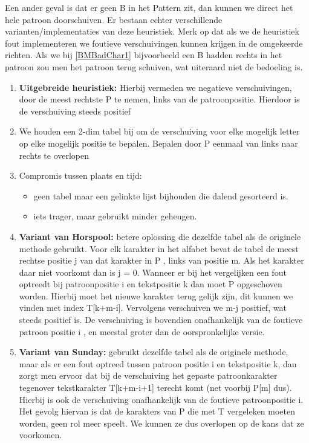 Een ander geval is dat er geen B in het Pattern zit, dan kunnen we direct het hele patroon doorschuiven.
\clearpage
Er bestaan echter verschillende varianten/implementaties van deze heuristiek. Merk op dat als we de heuristiek fout implementeren we foutieve verschuivingen kunnen krijgen in de omgekeerde richten. Als we bij \ref{BMBadChar1} bijvoorbeeld een B hadden rechts in het patroon zou men het patroon terug schuiven, wat uiteraard niet de bedoeling is.
\begin{enumerate}
\item \textbf{Uitgebreide heuristiek:} Hierbij vermeden we negatieve verschuivingen, door de meest rechtste P te nemen, links van de patroonpositie. Hierdoor is de verschuiving steeds positief
\item We houden een 2-dim tabel bij om de verschuiving voor elke mogelijk letter op elke mogelijk positie te bepalen. Bepalen door P eenmaal van links naar rechts te overlopen
\item Compromis tussen plaats en tijd:
\begin{itemize}
\item geen tabel maar een gelinkte lijst bijhouden die dalend gesorteerd is.
\item iets trager, maar gebruikt minder geheugen.
\end{itemize}

\item \textbf{Variant van Horspool:} betere oplossing die dezelfde tabel als de originele methode gebruikt. Voor elk karakter in het alfabet bevat de tabel de meest rechtse positie j van dat karakter in P , links van positie m. Als het karakter daar niet voorkomt dan is j = 0. Wanneer er bij het vergelijken een fout optreedt bij patroonpositie i en tekstpositie k dan moet P opgeschoven worden. Hierbij moet het nieuwe karakter terug gelijk zijn, dit kunnen we vinden met index T[k+m-i]. Vervolgens verschuiven we m-j positief, wat steeds positief is.
\npar
De verschuiving is bovendien onafhankelijk van de foutieve patroon positie i , en meestal groter dan de oorspronkelijke versie.

\item \textbf{Variant van Sunday:} gebruikt dezelfde tabel als de originele methode, maar als er een fout optreed tussen patroon positie i en tekstpositie k, dan zorgt men ervoor dat bij de verschuiving het gepaste patroonkarakter tegenover tekstkarakter T[k+m-i+1] terecht komt (net voorbij P[m] dus).
\npar
Hierbij is ook de verschuiving onafhankelijk van de foutieve patroonpositie i. Het gevolg hiervan is dat de karakters van P die met T vergeleken moeten worden, geen rol meer speelt. We kunnen ze dus overlopen op de kans dat ze voorkomen.
\end{enumerate}